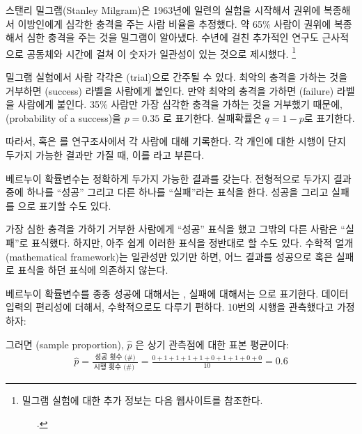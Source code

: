 
스탠리 밀그램(Stanley Milgram)은 1963년에 일련의 실험을 시작해서 권위에 복종해서 이방인에게 심각한 충격을 주는 사람 비율을 추정했다. 약 65\% 사람이 권위에 복종해서 심한 충격을 주는 것을 밀그램이 알아냈다. 수년에 걸친 추가적인 연구도 근사적으로 공동체와 시간에 걸쳐 이 숫자가 일관성이 있는 것으로 제시했다.
\footnote{밀그램 실험에 대한 추가 정보는 다음 웹사이트를 참조한다.\par \ \ \hspace{0.2mm}\ .}

밀그램 실험에서 사람 각각은 (trial)으로 간주될 수 있다. 최악의 충격을 가하는 것을 거부하면 (success) 라벨을 사람에게 붙인다. 만약 최악의 충격을 가하면 (failure) 라벨을 사람에게 붙인다. 35\% 사람만 가장 심각한 충격을 가하는 것을 거부했기 때문에, (probability of a success)을 $p=0.35$ 로 표기한다. 실패확률은 $q=1-p$로 표기한다.

따라서,  혹은 를 연구조사에서 각 사람에 대해 기록한다. 각 개인에 대한 시행이 단지 두가지 가능한 결과만 가질 때, 이를 라고 부른다.

\begin{termBox}{
베르누이 확률변수는 정확하게 두가지 가능한 결과를 갖는다. 전형적으로 두가지 결과 중에 하나를 ``성공'' 그리고 다른 하나를 ``실패''라는 표식을 한다. 성공을  그리고 실패를 으로 표기할 수도 있다.}
\end{termBox}

\begin{tipBox}{
가장 심한 충격을 가하기 거부한 사람에게 ``성공'' 표식을 했고 그밖의 다른 사람은 ``실패''로 표식했다. 하지만, 아주 쉽게 이러한 표식을 정반대로 할 수도 있다. 수학적 얼개(mathematical framework)는 일관성만 있기만 하면, 어느 결과를 성공으로 혹은 실패로 표식을 하던 표식에 의존하지 않는다.}
\end{tipBox}

베르누이 확률변수를 종종 성공에 대해서는 , 실패에 대해서는  으로 표기한다. 데이터 입력의 편리성에 더해서, 수학적으로도 다루기 편하다. 10번의 시행을 관측했다고 가정하자:

\begin{center}
         
\end{center}
그러면 (sample proportion), $\hat{p}$ 은 상기 관측점에 대한 표본 평균이다:
\begin{eqnarray*}
\hat{p} = \frac{\text{ 성공 횟수 (\#) }}{\text{시행 횟수 (\#) }} = \frac{0+1+1+1+1+0+1+1+0+0}{10} = 0.6
\end{eqnarray*}%

